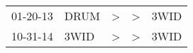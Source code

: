 \begin{supertabular}{lllll}
 01-20-13 &  DRUM &  \textgreater &  \textgreater &  3WID \\
 10-31-14 &  3WID &  \textgreater &  \textgreater &  3WID \\
\end{supertabular}
